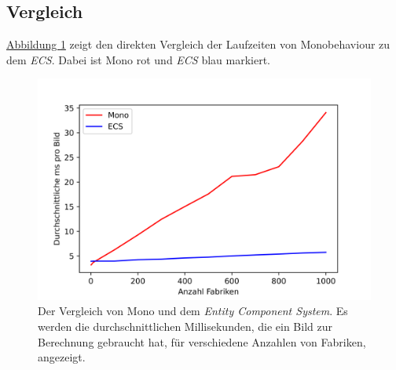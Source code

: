 \subsection{Vergleich}
\hyperref[fig:benchmark]{Abbildung \ref*{fig:benchmark}} zeigt den direkten Vergleich der Laufzeiten von Monobehaviour zu dem \textit{ECS}. Dabei ist Mono rot und \textit{ECS} blau markiert.
\begin{figure}[H]
\centering
\includegraphics[scale=0.8]{Bilder/Benchmark.png}
\caption[Der Vergleich von Mono und dem \textit{Entity Component System}]{Der Vergleich von Mono und dem \textit{Entity Component System}. Es werden die durchschnittlichen Millisekunden, die ein Bild zur Berechnung gebraucht hat, für verschiedene Anzahlen von Fabriken, angezeigt.}
\label{fig:benchmark}
\end{figure}

